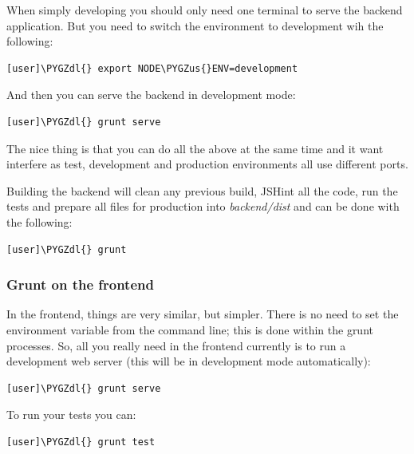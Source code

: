 \documentclass[letterpaper,10pt,english]{sphinxmanual}
\def\PYGZus{\char`\_}
\def\PYGZdl{\char`\$}
\begin{document}
When simply developing you should only need one terminal to serve the
backend application. But you need to switch the environment to
development wih the following:

\begin{Verbatim}[commandchars=\\\{\}]
[user]\PYGZdl{} export NODE\PYGZus{}ENV=development
\end{Verbatim}

And then you can serve the backend in development mode:

\begin{Verbatim}[commandchars=\\\{\}]
[user]\PYGZdl{} grunt serve
\end{Verbatim}

The nice thing is that you can do all the above at the same time and it
want interfere as test, development and production environments all
use different ports.

Building the backend will clean any previous build, JSHint all the
code, run the tests and prepare all files for production into
\emph{backend/dist} and can be done with the following:

\begin{Verbatim}[commandchars=\\\{\}]
[user]\PYGZdl{} grunt
\end{Verbatim}


\subsubsection{Grunt on the frontend}
\label{developer-guide:grunt-on-the-frontend}
In the frontend, things are very similar, but simpler. There is no
need to set the environment variable from the command line; this is
done within the grunt processes. So, all you really need in the
frontend currently is to run a development web server (this will be in
development mode automatically):

\begin{Verbatim}[commandchars=\\\{\}]
[user]\PYGZdl{} grunt serve
\end{Verbatim}

To run your tests you can:

\begin{Verbatim}[commandchars=\\\{\}]
[user]\PYGZdl{} grunt test
\end{Verbatim}
\end{document}
